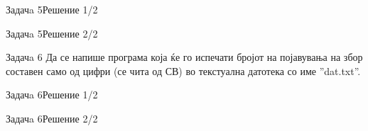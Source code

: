 \begin{frame}[fragile]{Задачa 5}{Решение 1/2}

\end{frame}

\begin{frame}[fragile]{Задачa 5}{Решение 2/2}

\end{frame}

\begin{frame}{Задачa 6}
Да се напише програма која ќе го испечати бројот на појавувања на збор
составен само од цифри (се чита од СВ) во текстуална датотека со име ''dat.txt''.
\end{frame}

\begin{frame}[fragile]{Задачa 6}{Решение 1/2}

\end{frame}

\begin{frame}[fragile]{Задачa 6}{Решение 2/2}

\end{frame}

